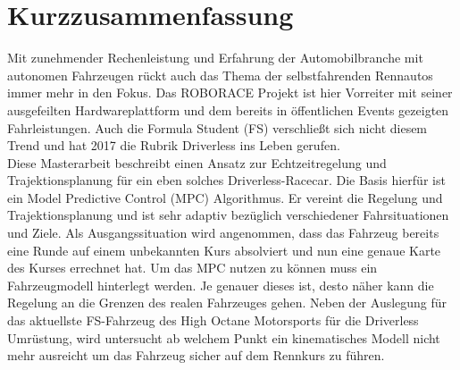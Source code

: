 
\chapter*{Kurzzusammenfassung}

Mit zunehmender Rechenleistung und Erfahrung der Automobilbranche mit autonomen Fahrzeugen rückt auch das Thema der selbstfahrenden Rennautos immer mehr in den Fokus. Das ROBORACE Projekt ist hier Vorreiter mit seiner ausgefeilten Hardwareplattform und dem bereits in öffentlichen Events gezeigten Fahrleistungen. Auch die Formula Student (FS) verschließt sich nicht diesem Trend und hat 2017 die Rubrik Driverless ins Leben gerufen. \\
Diese Masterarbeit beschreibt einen Ansatz zur Echtzeitregelung und Trajektionsplanung für ein eben solches Driverless-Racecar. Die Basis hierfür ist ein Model Predictive Control (MPC) Algorithmus. Er vereint die Regelung und Trajektionsplanung und ist sehr adaptiv bezüglich verschiedener Fahrsituationen und Ziele.
Als Ausgangssituation wird angenommen, dass das Fahrzeug bereits eine Runde auf einem unbekannten Kurs absolviert und nun eine genaue Karte des Kurses errechnet hat. 
Um das MPC nutzen zu können muss ein Fahrzeugmodell hinterlegt werden. Je genauer dieses ist, desto näher kann die Regelung an die Grenzen des realen Fahrzeuges gehen. Neben der Auslegung für das aktuellste FS-Fahrzeug des High Octane Motorsports für die Driverless Umrüstung, wird untersucht ab welchem Punkt ein kinematisches Modell nicht mehr ausreicht um das Fahrzeug sicher auf dem Rennkurs zu führen.


